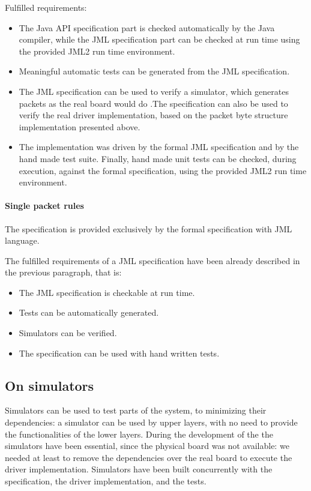 \documentclass{article} \usepackage{times}
\begin{document}
Fulfilled requirements:

\begin{itemize}
\item The Java API specification part is checked automatically by the
  Java compiler, while the JML specification part can be checked at
  run time using the provided JML2 run time environment.
\item Meaningful automatic tests can be generated from the JML
  specification.
\item The JML specification can be used to verify a simulator, which
  generates packets as the real board would do .The specification can
  also be used to verify the real driver implementation, based on the
  packet byte structure implementation presented above.
\item The implementation was driven by the formal JML specification
  and by the hand made test suite.  Finally, hand made unit tests can
  be checked, during execution, against the formal specification,
  using the provided JML2 run time environment.
\end{itemize}

\paragraph{Single packet rules}

The specification is provided exclusively by the formal specification
with JML language.

The fulfilled requirements of a JML specification have been already
described in the previous paragraph, that is:

\begin{itemize}
\item The JML specification is checkable at run time.
\item Tests can be automatically generated.
\item Simulators can be verified.
\item The specification can be used with hand written tests.
\end{itemize}

\subsection{On simulators}
\label{subsec:on_simulators}

Simulators can be used to test parts of the system, to minimizing
their dependencies: a simulator can be used by upper layers, with no
need to provide the functionalities of the lower layers.  During the
development of the \STSB the simulators have been essential, since the
physical board was not available: we needed at least to remove the
dependencies over the real board to execute the driver implementation.
Simulators have been built concurrently with the specification, the
driver implementation, and the tests.
\end{document}
